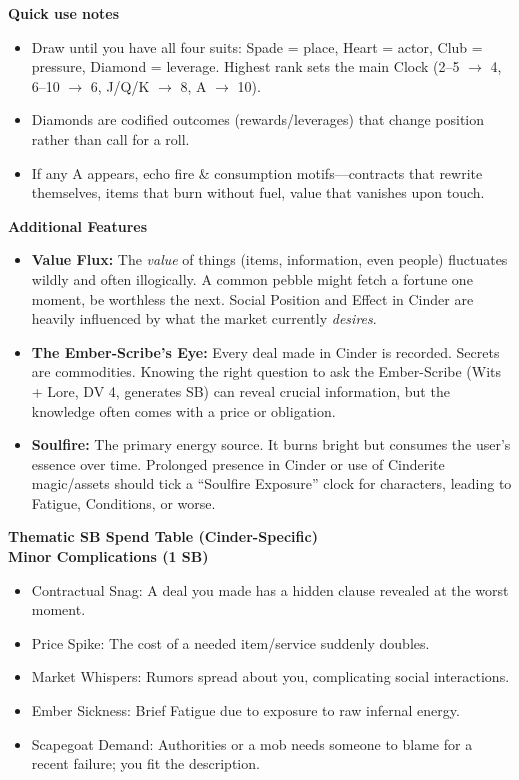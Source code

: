 \documentclass[11pt,letterpaper]{article}
\newcommand{\patronbox}[1]{\noindent\textbf{#1}\\}
\begin{document}
\patronbox{Quick use notes}
\begin{itemize}[leftmargin=*]
    \item Draw until you have all four suits: Spade = place, Heart = actor, Club = pressure, Diamond = leverage. Highest rank sets the main Clock (2--5 $\rightarrow$ 4, 6--10 $\rightarrow$ 6, J/Q/K $\rightarrow$ 8, A $\rightarrow$ 10).
    \item Diamonds are codified outcomes (rewards/leverages) that change position rather than call for a roll.
    \item If any A appears, echo fire \& consumption motifs---contracts that rewrite themselves, items that burn without fuel, value that vanishes upon touch.
\end{itemize}

\patronbox{Additional Features}
\begin{itemize}[leftmargin=*]
    \item \textbf{Value Flux:} The \textit{value} of things (items, information, even people) fluctuates wildly and often illogically. A common pebble might fetch a fortune one moment, be worthless the next. Social Position and Effect in Cinder are heavily influenced by what the market currently \textit{desires}.
    \item \textbf{The Ember-Scribe's Eye:} Every deal made in Cinder is recorded. Secrets are commodities. Knowing the right question to ask the Ember-Scribe (Wits + Lore, DV 4, generates SB) can reveal crucial information, but the knowledge often comes with a price or obligation.
    \item \textbf{Soulfire:} The primary energy source. It burns bright but consumes the user's essence over time. Prolonged presence in Cinder or use of Cinderite magic/assets should tick a ``Soulfire Exposure'' clock for characters, leading to Fatigue, Conditions, or worse.
\end{itemize}

\patronbox{Thematic SB Spend Table (Cinder-Specific)}
\textbf{Minor Complications (1 SB)}
\begin{itemize}[leftmargin=*]
    \item Contractual Snag: A deal you made has a hidden clause revealed at the worst moment.
    \item Price Spike: The cost of a needed item/service suddenly doubles.
    \item Market Whispers: Rumors spread about you, complicating social interactions.
    \item Ember Sickness: Brief Fatigue due to exposure to raw infernal energy.
    \item Scapegoat Demand: Authorities or a mob needs someone to blame for a recent failure; you fit the description.
\end{itemize}
\end{document}
